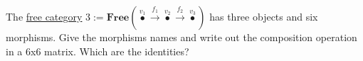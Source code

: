 The \href{doc/1 math/Seven Sketches in Compositionality/Chapter 3: Databases/2 Categories/1 Free Categories/2 Free category on a graph}{free category} $3 := \mathbf{Free}(\boxed{\overset{v_1}\bullet \xrightarrow{f_1}\overset{v_2}{\bullet}\xrightarrow{f_2}\overset{v_3}{\bullet}})$ has three objects and six morphisms. Give the morphisms names and write out the composition operation in a 6x6 matrix. Which are the identities?